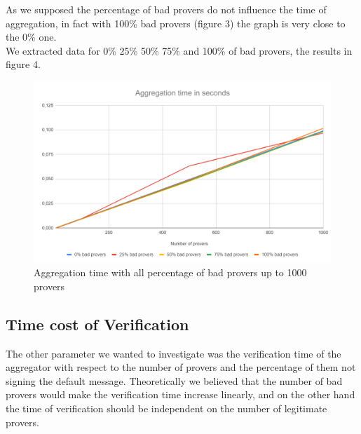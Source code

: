\documentclass[10pt, a4paper, twocolumn]{article} %
\begin{document}
As we supposed the percentage of bad provers do not influence the time of aggregation, in fact with 100\% bad provers (figure 3) the graph is very close to the 0\% one.\\ 
We extracted data for 0\% 25\% 50\% 75\% and 100\% of bad provers, the results in figure 4.\\
\begin{figure}
	\includegraphics[width=\linewidth]{images/aggregation_comparison.png} %
	\caption{Aggregation time with all percentage of bad provers up to 1000 provers} %
	\label{bear} %
\end{figure}

\subsection{Time cost of Verification}
The other parameter we wanted to investigate was the verification time of the aggregator with respect to the number of provers and the percentage of them not signing the default message.
Theoretically we believed that the number of bad provers would make the verification time increase linearly, and on the other hand the time of verification should be independent on the number of legitimate provers.\\
\end{document}
